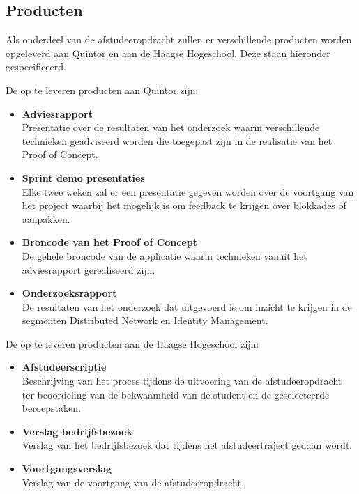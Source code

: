 \subsection{Producten}

Als onderdeel van de afstudeeropdracht zullen er verschillende producten worden opgeleverd aan Quintor en aan de Haagse Hogeschool. Deze staan hieronder gespecificeerd.

De op te leveren producten aan Quintor zijn:
\begin{itemize}
  \item{\textbf{Adviesrapport}}
  \\ Presentatie over de resultaten van het onderzoek waarin verschillende technieken geadviseerd worden die toegepast zijn in de realisatie van het Proof of Concept.
  \item{\textbf{Sprint demo presentaties}}
  \\ Elke twee weken zal er een presentatie gegeven worden over de voortgang van het project waarbij het mogelijk is om feedback te krijgen over blokkades of aanpakken.
  \item{\textbf{Broncode van het Proof of Concept}}
  \\ De gehele broncode van de applicatie waarin technieken vanuit het adviesrapport gerealiseerd zijn.
  \item{\textbf{Onderzoeksrapport}}
  \\ De resultaten van het onderzoek dat uitgevoerd is om inzicht te krijgen in de segmenten Distributed Network en Identity Management.
\end{itemize}

\newpage
De op te leveren producten aan de Haagse Hogeschool zijn:
\begin{itemize}
  \item{\textbf{Afstudeerscriptie}}
  \\ Beschrijving van het proces tijdens de uitvoering van de afstudeeropdracht ter beoordeling van de bekwaamheid van de student en de geselecteerde beroepstaken.
  \item{\textbf{Verslag bedrijfsbezoek}}
  \\ Verslag van het bedrijfsbezoek dat tijdens het afstudeertraject gedaan wordt.
  \item{\textbf{Voortgangsverslag}}
  \\ Verslag van de voortgang van de afstudeeropdracht.
\end{itemize}


